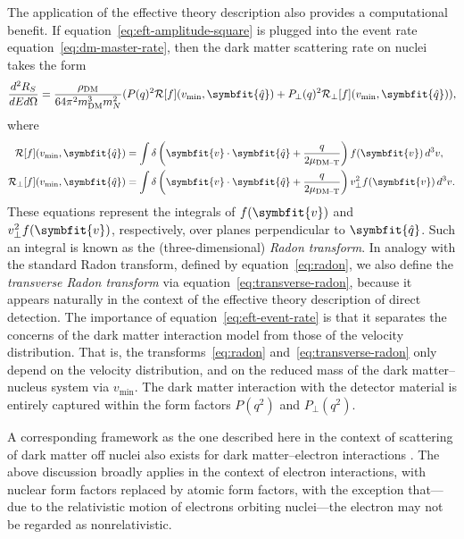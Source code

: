 \documentclass[b5paper, 10pt, twoside]{book}
\renewcommand{\vec}[1]{\symbfit{#1}}
\newcommand{\ddder}[3]{\frac{d^2#1}{d#2d#3}}
\newcommand{\unitv}[1]{\symbfit{\hat{#1}}}
\newcommand{\difd}{\,d}
\begin{document}
The application of the effective theory description also provides a computational benefit. If equation~\eqref{eq:eft-amplitude-square} is plugged into the event rate equation~\eqref{eq:dm-master-rate}, then the dark matter scattering rate on nuclei takes the form
\begin{equation}
    \ddder{R_S}{E}{\Omega}=\frac{\rho_\text{DM}}{64\pi^2m_\text{DM}^3m_N^2}(P(q)^2\mathcal{R}[f](v_\text{min},\unitv{q})+P_\perp(q)^2\mathcal{R}_\perp[f](v_\text{min},\unitv{q})),
    \label{eq:eft-event-rate}
\end{equation}
where
\begin{align}
    \label{eq:radon}
    \mathcal{R}[f](v_\text{min},\unitv{q})&=\int\delta\left(\vec{v}\cdot\unitv{q}+\frac{q}{2\mu_\text{DM--T}}\right)f(\vec{v})\difd^3v,\\
    \label{eq:transverse-radon}
    \mathcal{R}_\perp[f](v_\text{min},\unitv{q})&=\int\delta\left(\vec{v}\cdot\unitv{q}+\frac{q}{2\mu_\text{DM--T}}\right)v_\perp^2f(\vec{v})\difd^3v.
\end{align}
These equations represent the integrals of $f(\vec{v})$ and $v_\perp^2f(\vec{v})$, respectively, over planes perpendicular to $\unitv{q}$. Such an integral is known as the (three-dimensional) \emph{Radon transform}. In analogy with the standard Radon transform, defined by equation~\eqref{eq:radon}, we also define the \emph{transverse Radon transform} via equation~\eqref{eq:transverse-radon}, because it appears naturally in the context of the effective theory description of direct detection. The importance of equation~\eqref{eq:eft-event-rate} is that it separates the concerns of the dark matter interaction model from those of the velocity distribution. That is, the transforms~\eqref{eq:radon} and~\eqref{eq:transverse-radon} only depend on the velocity distribution, and on the reduced mass of the dark matter--nucleus system via $v_\text{min}$. The dark matter interaction with the detector material is entirely captured within the form factors $P(q^2)$ and $P_\perp(q^2)$.

A corresponding framework as the one described here in the context of scattering of dark matter off nuclei also exists for dark matter--electron interactions \parencites{CatenaEtAl2020, CatenaEtAl2021}. The above discussion broadly applies in the context of electron interactions, with nuclear form factors replaced by atomic form factors, with the exception that---due to the relativistic motion of electrons orbiting nuclei---the electron may not be regarded as nonrelativistic.
\end{document}
